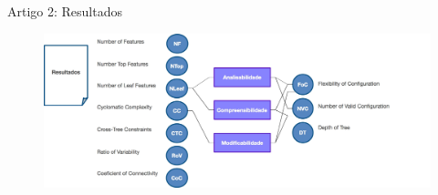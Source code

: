 
\begin{frame}[t, fragile]{Artigo 2: Resultados}        
  \begin{figure}[hbt]
    \includegraphics[scale=0.27]{imagens/artigo2-resultados-1.jpg}
  \end{figure}
\end{frame}
  

